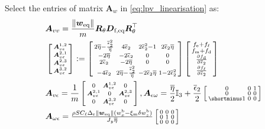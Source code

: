 \begin{algorithm}
\begin{algorithmic}[1]
\State Select the entries of matrix $\boldsymbol{A}_w$ in \eqref{eq:lpv_linearisation} as:
\begin{align}
\label{eq:Avv_alg2}
& \boldsymbol{A}_{vv} =
\frac{\| \boldsymbol{w}_{\mathrm{eq}} \| }{m} 
 \boldsymbol{R}_\theta \boldsymbol{D}_{\text{f,eq}}  \boldsymbol{R}_\theta^\top \\
\nonumber
&\smallmat{\boldsymbol{A}_{v\epsilon}^{1,2} \\ 
 \boldsymbol{A}_{v\epsilon}^{2,1} \\ \boldsymbol{A}_{v\epsilon}^{2,3} \\ \boldsymbol{A}_{v\epsilon}^{3,2}}
      := \smallmat{ 2 \overline{\eta}  - \frac{\overline \epsilon_{2}^{2}}{\overline{\eta} }  & 4 \overline \epsilon_{2} &  2\overline \epsilon_{2}^{2} -1 & 2\overline \epsilon_{2} \overline{\eta} \\
     -2 \overline{\eta}  & -2 \overline \epsilon_{2} & 0 & 0 \\ 
      2 \overline \epsilon_{2} & -2 \overline{\eta}  & 0 & 0 \\
      -4 \overline \epsilon_{2} & 2 \overline{\eta}  - \frac{\overline \epsilon_{2}^{2}}{\overline{\eta} } & -2\overline \epsilon_{2} \overline{\eta}  & 1- 2\overline \epsilon_{2}^{2}   }\smallmat{ f_{\text{e}}  + f_{\ell}  \\ f_{\text{m}}  + f_{\text{d}}  \\ \frac{\partial  f_{\text{d}}  }{\partial \overline \epsilon_{2}} \\ \frac{\partial  f_{\ell}  }{\partial \overline \epsilon_{2}}}\\
\label{eq:Aveps_derivation_ALG}
&  \boldsymbol{A}_{v\epsilon} = \frac{1}{m}\smallmat{ 
        0 & \boldsymbol{A}_{v\epsilon}^{1,2} & 0 \\ 
        \boldsymbol{A}_{v\epsilon}^{2,1} & 0 & \boldsymbol{A}_{v\epsilon}^{2,3}  \\
        0 & \boldsymbol{A}_{v\epsilon}^{3,2} & 0
   }, 
   \boldsymbol{A}_{\epsilon \omega} = \frac{\overline{\eta}  }{2} \mathbb{I}_{3} + \frac{\overline \epsilon_{2}}{2}\smallmat{
        0 & 0 &  1 \\ 
        0 & 0 & 0  \\
        \shortminus 1 & 0 & 0
    }\\
\label{eq:ddotomega_deps}
&   \boldsymbol{A}_{ \omega \epsilon} = \tfrac{\rho S C_{\ell} \Delta_{\text{r}}  \lVert \boldsymbol{w}_{\mathrm{eq}} \rVert (w^{\text{b}}_{x} -  \xi_{\text{m}} \delta w^{\text{b}}_{z})}{J_{y} \overline{\eta}  } \smallmat{ 
        0 & 0 & 0 \\ 
        0 & 1  & 0  \\
       0 & 0 & 0
    }
\end{align}


\end{algorithmic}
\end{algorithm}
